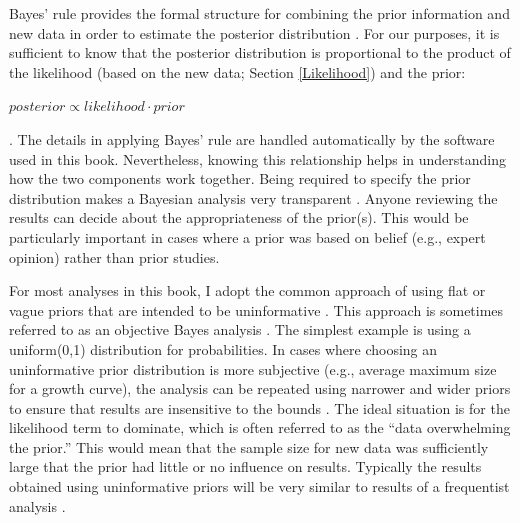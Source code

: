 \documentclass[
]{krantz}
\begin{document}
Bayes' rule provides the formal structure for combining the prior information and new data in order to estimate the posterior distribution \citep{link.etal_2002, kéry.schaub_2012}. For our purposes, it is sufficient to know that the posterior distribution is proportional to the product of the likelihood (based on the new data; Section \ref{Likelihood}) and the prior:

\(posterior \propto likelihood \cdot prior\)

\citep{lunn.etal_2012}. The details in applying Bayes' rule are handled automatically by the software used in this book. Nevertheless, knowing this relationship helps in understanding how the two components work together. Being required to specify the prior distribution makes a Bayesian analysis very transparent \citep{kéry.schaub_2012}. Anyone reviewing the results can decide about the appropriateness of the prior(s). This would be particularly important in cases where a prior was based on belief (e.g., expert opinion) rather than prior studies.

For most analyses in this book, I adopt the common approach of using flat or vague priors that are intended to be uninformative \citep{royle.dorazio_2008, kéry.schaub_2012}. This approach is sometimes referred to as an objective Bayes analysis \citep{link.etal_2002}. The simplest example is using a uniform(0,1) distribution for probabilities. In cases where choosing an uninformative prior distribution is more subjective (e.g., average maximum size for a growth curve), the analysis can be repeated using narrower and wider priors to ensure that results are insensitive to the bounds \citep{kéry.schaub_2012}. The ideal situation is for the likelihood term to dominate, which is often referred to as the ``data overwhelming the prior.'' This would mean that the sample size for new data was sufficiently large that the prior had little or no influence on results. Typically the results obtained using uninformative priors will be very similar to results of a frequentist analysis \citep{link.etal_2002, mccarthy_2007, kéry_2010, kéry.schaub_2012}.
\end{document}
